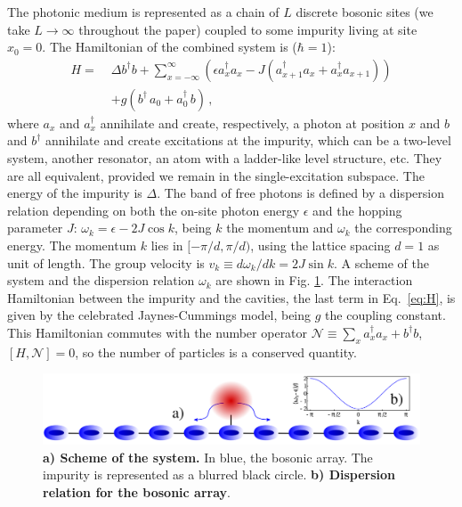 \documentclass[aps,pra,twocolumn,floatfix,superscriptaddress]{revtex4-1}%
\begin{document}
The photonic medium is represented as a chain of $L$ discrete bosonic sites (we take $L\to\infty$ throughout the paper) coupled to some impurity living at site $x_0=0$. 
The Hamiltonian of the combined system is ($\hbar =1$):
\begin{align}
\label{eq:H} H   = \; &  
\Delta b^\dagger b  + 
\sum_{x=-\infty}^\infty \left(\epsilon a^\dagger_x a_x -  J ( a_{x+1}^\dagger a_x  + a_{x}^\dagger a_{x+1})\right)
 \nonumber\\
&  + g ( b^\dagger \,  a_0 +   a_0^\dagger \, b) \, ,
\end{align}
where $a_{x}$ and $a_{x}^\dagger$  annihilate and create, respectively, a photon at position $x$ and $b$ and $b^\dagger$ annihilate and create excitations at the impurity,
 which can be a two-level system, another resonator, an atom with a ladder-like level structure, etc. {\color{blue}They are all equivalent, provided we remain in the single-excitation subspace.}
The energy of the impurity is $\Delta$.
The band of free photons is defined by a dispersion relation depending on both the on-site photon energy $\epsilon$ and the hopping parameter $J$:  $\omega_k = \epsilon  - 2 J \cos k$, being $k$ the momentum and $\omega_k$ the corresponding energy. The momentum $k$ lies in $[-\pi/d,\pi/d)$, using the lattice spacing $d=1$ as unit of length. The group velocity is $v_k\equiv d\omega_k/dk=2J\sin k$. 
A scheme of the system and the dispersion relation $\omega_k$ are shown in Fig. \ref{fig:scheme}.
The interaction Hamiltonian between the impurity and the cavities, the last term in Eq.\ \eqref{eq:H}, is given by the celebrated Jaynes-Cummings model, being $g$ the coupling constant.
This Hamiltonian commutes with the number operator $\mathcal{N}\equiv \sum_x a_x^\dagger a_x + b^\dagger b$, $[H,\mathcal{N}]=0$, so the number of particles is a conserved quantity.


\begin{figure}[thb!]
\includegraphics[width=1\columnwidth]{fig1_imp_gimp.pdf}
\caption{ {\bf a) Scheme of the system.} In blue, the bosonic array. The impurity is represented as a blurred black circle. {\bf b) Dispersion relation for the bosonic array}.}\label{fig:scheme}
\end{figure}
\end{document}
